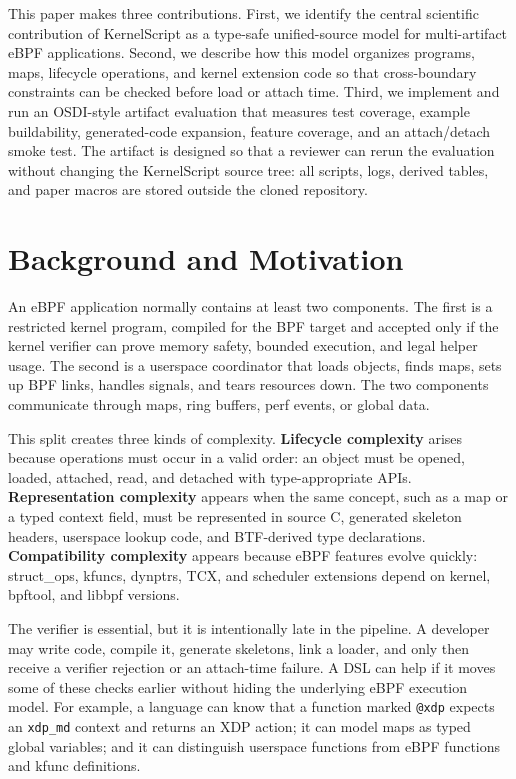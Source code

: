 \documentclass[10pt,twocolumn]{article}
\newcommand{\tool}{KernelScript}
\begin{document}
This paper makes three contributions.  First, we identify the central
scientific contribution of \tool{} as a type-safe unified-source model for
multi-artifact eBPF applications.  Second, we describe how this model
organizes programs, maps, lifecycle operations, and kernel extension code so
that cross-boundary constraints can be checked before load or attach time.
Third, we implement and run an OSDI-style artifact evaluation that measures
test coverage, example buildability, generated-code expansion, feature
coverage, and an attach/detach smoke test.  The artifact is designed so that a
reviewer can rerun the evaluation without changing the \tool{} source tree:
all scripts, logs, derived tables, and paper macros are stored outside the
cloned repository.

\section{Background and Motivation}

An eBPF application normally contains at least two components.  The first is a
restricted kernel program, compiled for the BPF target and accepted only if the
kernel verifier can prove memory safety, bounded execution, and legal helper
usage.  The second is a userspace coordinator that loads objects, finds maps,
sets up BPF links, handles signals, and tears resources down.  The two
components communicate through maps, ring buffers, perf events, or global data.

This split creates three kinds of complexity.  \textbf{Lifecycle complexity}
arises because operations must occur in a valid order: an object must be
opened, loaded, attached, read, and detached with type-appropriate APIs.
\textbf{Representation complexity} appears when the same concept, such as a
map or a typed context field, must be represented in source C, generated
skeleton headers, userspace lookup code, and BTF-derived type declarations.
\textbf{Compatibility complexity} appears because eBPF features evolve quickly:
struct\_ops, kfuncs, dynptrs, TCX, and scheduler extensions depend on kernel,
bpftool, and libbpf versions.

The verifier is essential, but it is intentionally late in the pipeline.  A
developer may write code, compile it, generate skeletons, link a loader, and
only then receive a verifier rejection or an attach-time failure.  A DSL can
help if it moves some of these checks earlier without hiding the underlying
eBPF execution model.  For example, a language can know that a function marked
\texttt{@xdp} expects an \texttt{xdp\_md} context and returns an XDP action; it
can model maps as typed global variables; and it can distinguish userspace
functions from eBPF functions and kfunc definitions.
\end{document}
